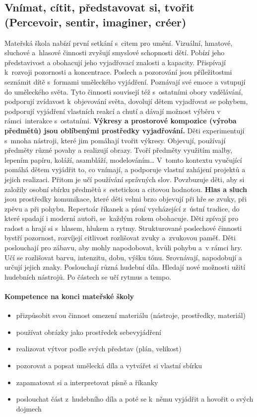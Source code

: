 		\subsection{Vnímat, cítit, představovat si, tvořit (Percevoir, sentir, imaginer, créer)}
			Mateřská škola nabízí první setkání s citem pro umění. Vizuální, hmatové, sluchové a hlasové činnosti zvyšují smyslové schopnosti dětí. Pobízí jeho představivost a obohacují jeho vyjadřovací znalosti a kapacity. Přispívají k rozvoji pozornosti a koncentrace. Poslech a pozorování jsou příležitostmi seznámit dítě s formami uměleckého vyjádření. Poznávají své emoce a vstupují do uměleckého světa.
			Tyto činnosti souvisejí též s ostatními obory vzdělávání, podporují zvídavost k objevování světa, dovolují dětem vyjadřovat se pohybem, podporují vyjádření vlastních reakcí a chutí a dávají možnost výběru v rámci interakce s ostatními.
			\textbf{Výkresy a prostorové kompozice (výroba předmětů) jsou oblíbenými prostředky vyjadřování.}
			Děti experimentují s mnoha nástroji, které jim pomáhají tvořit výkresy. Objevují, používají předměty různé povahy a realizují obrazy. Tvoří předměty využitím malby, lepením papíru, koláží, asambláží, modelováním…
			V tomto kontextu vyučující pomáhá dětem vyjádřit to, co vnímají, a podporuje vlastní zahájení projektů a jejich realizaci. Přitom je učí používání správných slov. Povzbuzuje děti, aby si založily osobní sbírku předmětů s estetickou a citovou hodnotou.
			\textbf{Hlas a sluch} jsou prostředky komunikace, které děti velmi brzo objevují při hře se zvuky, při zpěvu a při pohybu.
			Repertoár říkanek a písní vycházející z ústní tradice, do které spadají i moderní autoři, se každým rokem obohacuje. Děti zpívají pro radost a hrají si s hlasem, hlukem a rytmy.
			Strukturované poslechové činnosti bystří pozornost, rozvíjejí citlivost rozlišovat zvuky a zvukovou paměť. Děti poslouchají pro zábavu, aby mohly napodobovat, kvůli pohybu a v rámci hry. Učí se rozlišovat barvu, intenzitu, dobu, výšku tónu. Srovnávají, napodobují a určují jejich znaky. Poslouchají různá hudební díla. Hledají nové možnosti užití hudebních nástrojů. Po částech se učí rytmus a tempo. 

			\paragraph{Kompetence na konci mateřské školy}
				\begin{itemize}
				\item přizpůsobit svou činnost omezení materiálu (nástroje, prostředky, materiál)
				\item používat obrázky jako prostředek sebevyjádření
				\item realizovat výtvor podle svých představ (plán, velikost)
				\item pozorovat a popsat umělecká díla a vytvářet si vlastní sbírku
				\item zapamatovat si a interpretovat písně a říkanky
				\item poslouchat část z hudebního díla a poté se k němu vyjádřit a hovořit o svých dojmech
				\end{itemize}


